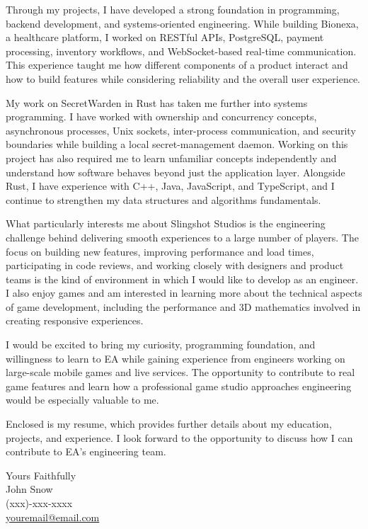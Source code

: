 \documentclass[11pt,a4]{article}
\begin{document}
Through my projects, I have developed a strong foundation in programming, backend development, and systems-oriented engineering. While building Bionexa, a healthcare platform, I worked on RESTful APIs, PostgreSQL, payment processing, inventory workflows, and WebSocket-based real-time communication. This experience taught me how different components of a product interact and how to build features while considering reliability and the overall user experience.

My work on SecretWarden in Rust has taken me further into systems programming. I have worked with ownership and concurrency concepts, asynchronous processes, Unix sockets, inter-process communication, and security boundaries while building a local secret-management daemon. Working on this project has also required me to learn unfamiliar concepts independently and understand how software behaves beyond just the application layer. Alongside Rust, I have experience with C++, Java, JavaScript, and TypeScript, and I continue to strengthen my data structures and algorithms fundamentals.

What particularly interests me about Slingshot Studios is the engineering challenge behind delivering smooth experiences to a large number of players. The focus on building new features, improving performance and load times, participating in code reviews, and working closely with designers and product teams is the kind of environment in which I would like to develop as an engineer. I also enjoy games and am interested in learning more about the technical aspects of game development, including the performance and 3D mathematics involved in creating responsive experiences.

I would be excited to bring my curiosity, programming foundation, and willingness to learn to EA while gaining experience from engineers working on large-scale mobile games and live services. The opportunity to contribute to real game features and learn how a professional game studio approaches engineering would be especially valuable to me.

Enclosed is my resume, which provides further details about my education, projects, and experience. I look forward to the opportunity to discuss how I can contribute to EA's engineering team.
 \par


\vspace{0.5cm}
\raggedright
Yours Faithfully \\ John Snow \\ (xxx)-xxx-xxxx \\ \href{mailto:youremail@email.com}{youremail@email.com}
\end{document}
